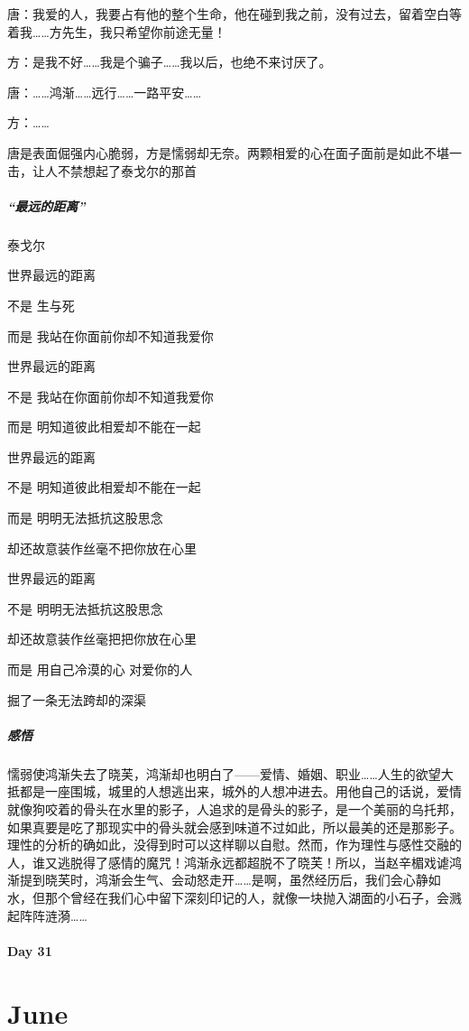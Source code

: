 \documentclass[UTF8,a4paper,8pt]{ctexbook}
\begin{document}
	 	 唐：我爱的人，我要占有他的整个生命，他在碰到我之前，没有过去，留着空白等着我……方先生，我只希望你前途无量！ 
	 	 
	 	 方：是我不好……我是个骗子……我以后，也绝不来讨厌了。 
	 	 
	 	 唐：……鸿渐……远行……一路平安…… 
	 	 
	 	 方：…… 
	 	 
	 	 唐是表面倔强内心脆弱，方是懦弱却无奈。两颗相爱的心在面子面前是如此不堪一击，让人不禁想起了泰戈尔的那首
	 	 
	 	 \subparagraph{“最远的距离”}泰戈尔
	 	 
	 	 世界最远的距离 
	 	 
	 	 不是 生与死 
	 	  
	 	 而是 我站在你面前你却不知道我爱你 
	 	 
	 	 世界最远的距离 
	 	 
	 	 不是 我站在你面前你却不知道我爱你 
	 	 
	 	 而是 明知道彼此相爱却不能在一起 
	 	 
	 	 世界最远的距离 
	 	 
	 	 不是 明知道彼此相爱却不能在一起 
	 	 
	 	 而是 明明无法抵抗这股思念 


	 	 却还故意装作丝毫不把你放在心里 
	 	 
	 	 世界最远的距离 
	 	 
	 	 不是 明明无法抵抗这股思念  
	 	 
	 	 却还故意装作丝毫把把你放在心里 
	 	 
	 	 而是 用自己冷漠的心 对爱你的人 
	 	 
	 	 掘了一条无法跨却的深渠 
	 	 
	 	 \subparagraph{感悟}
	 	 懦弱使鸿渐失去了晓芙，鸿渐却也明白了——爱情、婚姻、职业……人生的欲望大抵都是一座围城，城里的人想逃出来，城外的人想冲进去。用他自己的话说，爱情就像狗咬着的骨头在水里的影子，人追求的是骨头的影子，是一个美丽的乌托邦，如果真要是吃了那现实中的骨头就会感到味道不过如此，所以最美的还是那影子。理性的分析的确如此，没得到时可以这样聊以自慰。然而，作为理性与感性交融的人，谁又逃脱得了感情的魔咒！鸿渐永远都超脱不了晓芙！所以，当赵辛楣戏谑鸿渐提到晓芙时，鸿渐会生气、会动怒走开……是啊，虽然经历后，我们会心静如水，但那个曾经在我们心中留下深刻印记的人，就像一块抛入湖面的小石子，会溅起阵阵涟漪……
 	 \paragraph{Day 31      \quad     }
 \section*{June}
\end{document}
